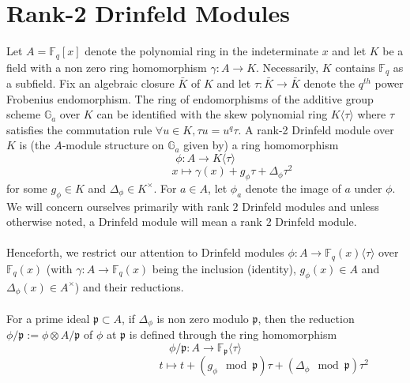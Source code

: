 \documentclass{article}
\theoremstyle{plain}
\theoremstyle{definition}
\def\F{\ensuremath{\mathbb{F}}}
\newcommand{\p}{\mathfrak p}
\newcommand{\f}{\mathfrak f}
\begin{document}
\section{Rank-2 Drinfeld Modules}\label{drinfeld_section}
\noindent Let $A=\F_q[x]$ denote the polynomial ring in the indeterminate $x$ and let $K$ be a field with a non zero ring homomorphism $\gamma:A \rightarrow K$. Necessarily, $K$ contains $\F_q$ as a subfield. Fix an algebraic closure $\bar{K}$ of $K$ and let $\tau: \bar{K} \longrightarrow \bar{K}$ denote the $q^{th}$ power Frobenius endomorphism. The ring of endomorphisms of the additive group scheme $\mathbb{G}_a$ over $K$ can be identified with the skew polynomial ring $K\langle \tau \rangle$ where $\tau$ satisfies the commutation rule $\forall u \in K, \tau u = u^q \tau$.
A rank-2 Drinfeld module over $K$ is (the $A$-module structure on $\mathbb{G}_a$ given by) a ring homomorphism
$$\phi : A \longrightarrow K\langle \tau \rangle$$ 
$$\ \ \ \ \ \ \ \ \ \ \ \ \ \ \ \ \ \ \ \ \ \ x \longmapsto \gamma(x) + g_\phi \tau + \Delta_\phi \tau^2$$
for some $g_\phi \in K$ and $\Delta_\phi \in K^\times$. For $a \in A$, let $\phi_a$ denote the image of $a$ under $\phi$. We will concern ourselves primarily with rank $2$ Drinfeld modules and unless otherwise noted, a Drinfeld module will mean a rank $2$ Drinfeld module.\\ \\
Henceforth, we restrict our attention to Drinfeld modules $\phi:A \longrightarrow \F_q(x)\langle\tau\rangle$ over $\F_q(x)$ (with $\gamma : A \rightarrow \F_q(x)$ being the inclusion (identity), $g_\phi(x)\in A$ and $\Delta_\phi(x)\in A^\times$) and their reductions.\\ \\
For a prime ideal $\p \subset A$, if $\Delta_\phi$ is non zero modulo $\p$, then the reduction $\phi/\p := \phi \otimes A/\p$ of $\phi$ at $\p$ is defined through the ring homomorphism $$\phi/\p : A \longrightarrow \F_\p\langle \tau \rangle$$ $$\ \ \ \ \ \ \ \ \ \ \ \ \ \ \ \ \ \ \ \ \ \ \ \ \ \ \ \ \ \ \ \ \ \ \ \ \ \ \ \ \ \ \ \ \ \ \ \ t \longmapsto t + (g_\phi \mod \p) \tau + (\Delta_\phi\mod\p) \tau^2$$
\end{document}
